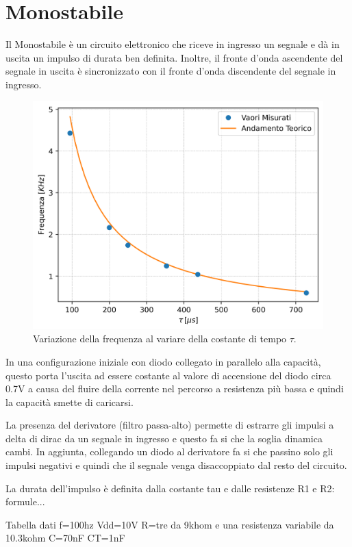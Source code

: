 \documentclass[a4paper,12pt]{article}
\begin{document}
\section*{Monostabile}
Il Monostabile è un circuito elettronico che riceve in ingresso un segnale e dà in uscita un impulso di durata ben definita. 
Inoltre, il fronte d'onda ascendente del segnale in uscita è sincronizzato con il fronte d'onda discendente del segnale in ingresso.

\begin{figure}[h]
    \centering
    \includegraphics[width=0.6\linewidth]{immagini/ocillatore/freq_tau.png}
    \caption{Variazione della frequenza al variare della costante di tempo $\tau$.}
    \label{fig:ocillatore_freq_tau}
\end{figure}

In una configurazione iniziale con diodo collegato in parallelo alla capacità, questo porta l'uscita ad essere costante al valore di accensione del diodo circa 0.7V a causa del fluire della corrente nel percorso a resistenza più bassa e quindi la capacità smette di caricarsi.

La presenza del derivatore (filtro passa-alto) permette di estrarre gli impulsi a delta di dirac da un segnale in ingresso e questo fa si che la soglia dinamica cambi.
In aggiunta, collegando un diodo al derivatore fa si che passino solo gli impulsi negativi e quindi che il segnale venga disaccoppiato dal resto del circuito.

La durata dell'impulso è definita dalla costante tau e dalle resistenze R1 e R2:
formule...

Tabella dati 
f=100hz
Vdd=10V
R=tre da 9khom e una resistenza variabile da 10.3kohm
C=70nF
CT=1nF
\end{document}

